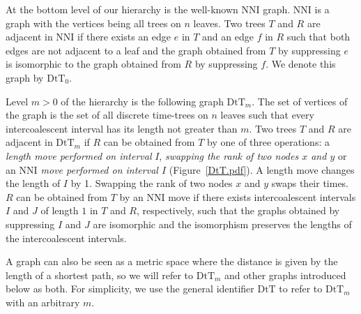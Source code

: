 \documentclass{amsart}
\theoremstyle{definition}
\newcommand{\nni}{\mathrm{NNI}}
\newcommand{\dtt}{\mathrm{DtT}}
\begin{document}
At the bottom level of our hierarchy is the well-known $\nni$ graph.
$\nni$ is a graph with the vertices being all trees on $n$ leaves.
Two trees $T$ and $R$ are adjacent in $\nni$ if there exists an edge $e$ in $T$ and an edge $f$ in $R$ such that both edges are not adjacent to a leaf and the graph obtained from $T$ by suppressing $e$ is isomorphic to the graph obtained from $R$ by suppressing $f$.
We denote this graph by $\dtt_0$.

Level $m > 0$ of the hierarchy is the following graph $\dtt_m$.
The set of vertices of the graph is the set of all discrete time-trees on $n$ leaves such that every intercoalescent interval has its length not greater than $m$.
Two trees $T$ and $R$ are adjacent in $\dtt_m$ if $R$ can be obtained from $T$ by one of three operations: a \emph{length move performed on interval} $I$, \emph{swapping the rank of two nodes $x$ and $y$} or an \emph{$\nni$ move performed on interval $I$} (Figure~\ref{DtT.pdf}).
A length move changes the length of $I$ by 1.
Swapping the rank of two nodes $x$ and $y$ swaps their times.
$R$ can be obtained from $T$ by an $\nni$ move if there exists intercoalescent intervals $I$ and $J$ of length $1$ in $T$ and $R$, respectively, such that the graphs obtained by suppressing $I$ and $J$ are isomorphic and the isomorphism preserves the lengths of the intercoalescent intervals.

A graph can also be seen as a metric space where the distance is given by the length of a shortest path, so we will refer to $\dtt_m$ and other graphs introduced below as both.
For simplicity, we use the general identifier $\dtt$ to refer to $\dtt_m$ with an arbitrary $m$.
\end{document}
